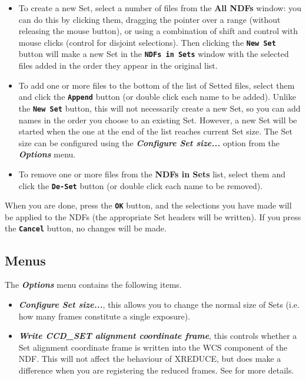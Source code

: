 \documentclass[11pt,nolof]{starlink}
\providecommand{\butt}[1]{{\bf \tt #1}}
\providecommand{\menu}[1]{{\bf \em #1}}
\providecommand{\wlab}[1]{{\bf #1}}
\begin{document}
\begin{itemize}
\item
To create a new Set, select a number of files from the \wlab{All NDFs}
window: you can do this by clicking them, dragging the pointer over
a range (without releasing the mouse button), or using a combination
of shift and control with mouse clicks (control for disjoint selections).
Then clicking the \butt{New Set} button will make a new Set in the
\butt{NDFs in Sets} window with the selected files added in the order
they appear in the original list.
\item
To add one or more files to the bottom of the list of Setted files,
select them and click the \butt{Append} button
(or double click each name to be added).
Unlike the \butt{New Set} button, this will not necessarily create
a new Set, so you can add names in the order you choose to an existing Set.
However, a new Set will be started when the one at the end of the
list reaches current Set size.  The Set size can be configured using
the \menu{Configure Set size...} option from the \menu{Options} menu.
\item
To remove one or more files from the \wlab{NDFs in Sets} list,
select them and click the \butt{De-Set} button
(or double click each name to be removed).
\end{itemize}

When you are done, press the \butt{OK} button, and the selections
you have made will be applied to the NDFs (the appropriate
Set headers will be written).
If you press the \butt{Cancel} button, no changes will be made.

\subsection{Menus }

The \menu{Options} menu contains the following items.
\begin{itemize}
\item \menu{Configure Set size...},
this allows you to change the normal size of Sets (i.e. how many
frames constitute a single exposure).
\item \menu{Write CCD\_SET alignment coordinate frame},
this controls whether a Set alignment coordinate frame is written into
the WCS component of the NDF.
This will not affect the behaviour of XREDUCE, but does make a difference
when you are registering the reduced frames.
See  for more details.
\end{itemize}
\end{document}
